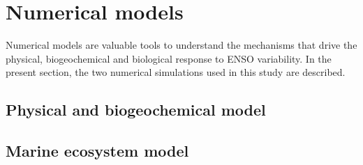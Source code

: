 \section{Numerical models}

Numerical models are valuable tools to understand the mechanisms that drive the physical, biogeochemical and biological response to ENSO variability. 
In the present section, the two numerical simulations used in this study are described.

\subsection{Physical and biogeochemical model}
\label{sec:nemo}


\subsection{Marine ecosystem model}
\label{sec:apecosm}


